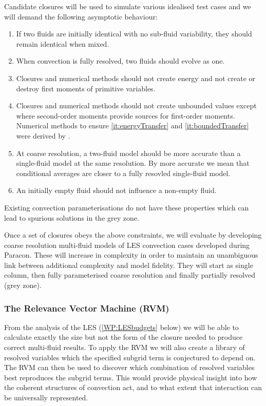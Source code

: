 \documentclass[11pt,a4paper]{article}
\begin{document}
Candidate closures will be used to simulate various idealised test cases and we will demand the following asymptotic behaviour:
\begin{enumerate}
\item If two fluids are initially identical with no sub-fluid variability, they should remain identical when mixed.
\item  When convection is fully resolved, two fluids should evolve as one.
\item\label{it:energyTransfer} Closures and numerical methods should not create energy and not create or destroy first moments of primitive variables.
\item\label{it:boundedTransfer} Closures and numerical methods should not create unbounded values except where second-order moments provide sources for first-order moments.  Numerical methods to ensure \ref{it:energyTransfer} and \ref{it:boundedTransfer} were derived by \cite{MWH20}.
\item At coarse resolution, a two-fluid model should be more accurate than a single-fluid model at the same resolution. By more accurate we mean that conditional averages are closer to a fully resovled single-fluid model.
\item An initially empty fluid should not influence a non-empty fluid.
\end{enumerate}
Existing convection parameterisations do not have these properties which can lead to spurious solutions in the grey zone.

Once a set of closures obeys the above constraints, we will evaluate by developing coarse resolution multi-fluid models of LES convection cases developed during Paracon. These will increase in complexity in order to maintain an unambiguous link between additional complexity and model fidelity. They will start as single column, then fully parameterised coarse resolution and finally partially resolved (grey zone). 

\subsubsection*{The Relevance Vector Machine (RVM)}

From the analysis of the LES (\ref{WP:LESbudgets} below) we will be able to calculate exactly the size but not the form of the closure needed to produce correct multi-fluid results. To apply the RVM we will also create a library of resolved variables which the specified subgrid term is conjectured to depend on. The RVM can then be used to discover which combination of resolved variables best reproduces the subgrid terms. This would provide physical insight into how the coherent structures of convection act, and to what extent that interaction can be universally represented.
\end{document}
